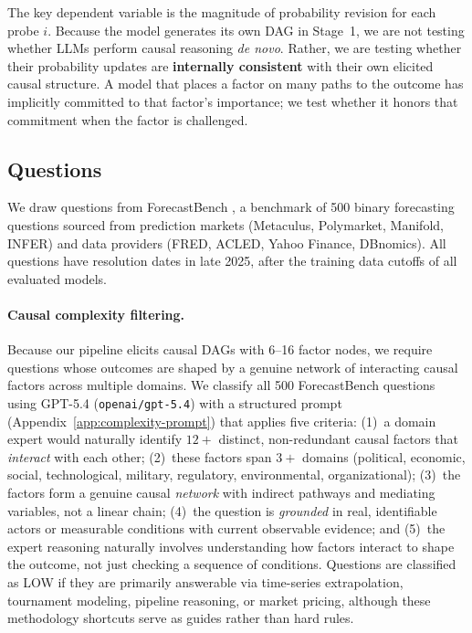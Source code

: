 \documentclass[11pt]{article}
\begin{document}
The key dependent variable is the magnitude of probability revision for each probe $i$. Because the model generates its own DAG in Stage~1, we are not testing whether LLMs perform causal reasoning \emph{de novo}. Rather, we are testing whether their probability updates are \textbf{internally consistent} with their own elicited causal structure. A model that places a factor on many paths to the outcome has implicitly committed to that factor's importance; we test whether it honors that commitment when the factor is challenged.

\subsection{Questions}

We draw questions from ForecastBench \cite{zou2024forecastbench}, a benchmark of 500 binary forecasting questions sourced from prediction markets (Metaculus, Polymarket, Manifold, INFER) and data providers (FRED, ACLED, Yahoo Finance, DBnomics). All questions have resolution dates in late 2025, after the training data cutoffs of all evaluated models.

\paragraph{Causal complexity filtering.} Because our pipeline elicits causal DAGs with 6--16 factor nodes, we require questions whose outcomes are shaped by a genuine network of interacting causal factors across multiple domains. We classify all 500 ForecastBench questions using GPT-5.4 (\texttt{openai/gpt-5.4}) with a structured prompt (Appendix~\ref{app:complexity-prompt}) that applies five criteria: (1)~a domain expert would naturally identify $12+$ distinct, non-redundant causal factors that \emph{interact} with each other; (2)~these factors span $3+$ domains (political, economic, social, technological, military, regulatory, environmental, organizational); (3)~the factors form a genuine causal \emph{network} with indirect pathways and mediating variables, not a linear chain; (4)~the question is \emph{grounded} in real, identifiable actors or measurable conditions with current observable evidence; and (5)~the expert reasoning naturally involves understanding how factors interact to shape the outcome, not just checking a sequence of conditions. Questions are classified as LOW if they are primarily answerable via time-series extrapolation, tournament modeling, pipeline reasoning, or market pricing, although these methodology shortcuts serve as guides rather than hard rules.
\end{document}
